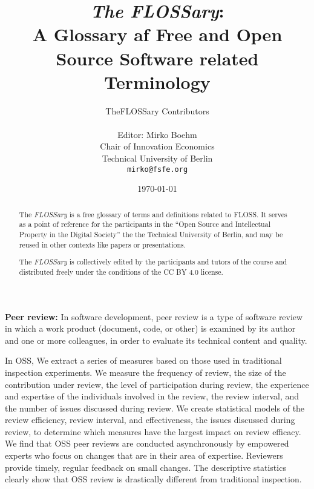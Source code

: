\documentclass[a4paper]{article}
\title{{\em The FLOSSary}:\\
  A Glossary af Free and Open Source Software related Terminology}
\author{TheFLOSSary Contributors\\
  \\
  Editor: Mirko Boehm\\
  Chair of Innovation Economics\\
  Technical University of Berlin\\
  \texttt{mirko@fsfe.org}}
\date{\today}
\begin{document}
\newcommand{\flossary}{{\em FLOSSary} }

\maketitle \thispagestyle{empty}
\begin{abstract}
  \noindent
  The \flossary is a free glossary of terms and definitions related to
  \gls{FLOSS}. It serves as a point of reference for the participants
  in the ``Open Source and Intellectual Property in the Digital
  Society'' the the Technical University of Berlin, and may be reused
  in other contexts like papers or presentations.

  The \flossary is
  collectively edited by the participants and tutors of the course and
  distributed freely under the conditions of the CC BY 4.0 license.
\end{abstract}

\begin{flushleft}
{\bf Peer review:} 
In software development, peer review is a type of software review in which a work product (document, code, or other) is examined by its author and one or more colleagues, in order to evaluate its technical content and quality. \bigskip

In OSS, We extract a series of measures based on those used in traditional inspection experiments. We measure the frequency of review, the size of the contribution under review, the level of participation during review, the experience and expertise of the individuals involved in the review, the review interval, and the number of issues discussed during review. We create statistical models of the review efficiency, review interval, and effectiveness, the issues discussed during review, to determine which measures have the largest impact on review efficacy. We find that OSS peer reviews are conducted asynchronously by empowered experts who focus on changes that are in their area of expertise. Reviewers provide timely, regular feedback on small changes. The descriptive statistics clearly show that OSS review is drastically different from traditional inspection. 
\end{flushleft}


\clearpage
\glsaddall
\printnoidxglossary[nonumberlist]
\clearpage
\printnoidxglossary[type=\acronymtype,nonumberlist]
\clearpage

\end{document}
